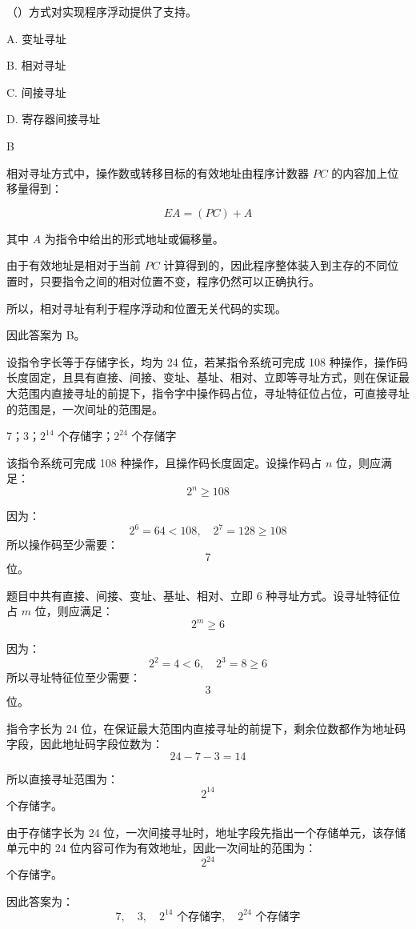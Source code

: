 \begin{question}
（）方式对实现程序浮动提供了支持。

A. 变址寻址

B. 相对寻址

C. 间接寻址

D. 寄存器间接寻址
\end{question}

\begin{answer}
B
\end{answer}

\begin{analysisenv}
相对寻址方式中，操作数或转移目标的有效地址由程序计数器 $PC$ 的内容加上位移量得到：

\[
EA=(PC)+A
\]

其中 $A$ 为指令中给出的形式地址或偏移量。

由于有效地址是相对于当前 $PC$ 计算得到的，因此程序整体装入到主存的不同位置时，只要指令之间的相对位置不变，程序仍然可以正确执行。

所以，相对寻址有利于程序浮动和位置无关代码的实现。

因此答案为 B。
\end{analysisenv}

\begin{question}
设指令字长等于存储字长，均为 24 位，若某指令系统可完成 108 种操作，操作码长度固定，且具有直接、间接、变址、基址、相对、立即等寻址方式，则在保证最大范围内直接寻址的前提下，指令字中操作码占\underline{\hspace{3cm}}位，寻址特征位占\underline{\hspace{3cm}}位，可直接寻址的范围是\underline{\hspace{3cm}}，一次间址的范围是\underline{\hspace{3cm}}。
\end{question}

\begin{answer}
7；3；$2^{14}$ 个存储字；$2^{24}$ 个存储字
\end{answer}

\begin{analysisenv}
该指令系统可完成 108 种操作，且操作码长度固定。设操作码占 $n$ 位，则应满足：
\[
2^n \ge 108
\]

因为：
\[
2^6=64<108,\quad 2^7=128\ge 108
\]
所以操作码至少需要：
\[
7
\]
位。

题目中共有直接、间接、变址、基址、相对、立即 6 种寻址方式。设寻址特征位占 $m$ 位，则应满足：
\[
2^m \ge 6
\]

因为：
\[
2^2=4<6,\quad 2^3=8\ge 6
\]
所以寻址特征位至少需要：
\[
3
\]
位。

指令字长为 24 位，在保证最大范围内直接寻址的前提下，剩余位数都作为地址码字段，因此地址码字段位数为：
\[
24-7-3=14
\]

所以直接寻址范围为：
\[
2^{14}
\]
个存储字。

由于存储字长为 24 位，一次间接寻址时，地址字段先指出一个存储单元，该存储单元中的 24 位内容可作为有效地址，因此一次间址的范围为：
\[
2^{24}
\]
个存储字。

因此答案为：
\[
7,\quad 3,\quad 2^{14}\text{ 个存储字},\quad 2^{24}\text{ 个存储字}
\]
\end{analysisenv}

